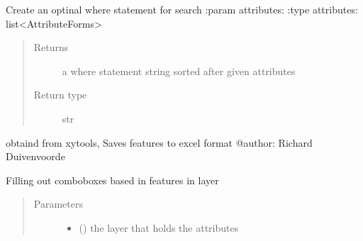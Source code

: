 \documentclass[letterpaper,10pt,english]{sphinxmanual}
\begin{document}
\begin{fulllineitems}
\begin{fulllineitems}
\end{fulllineitems}


\begin{fulllineitems}
\label{\detokenize{code:Tilgjengelighet.Tilgjengelighet.create_where_statement2}}
Create an optinal where statement for search
:param attributes:
:type attributes: list\textless{}AttributeForms\textgreater{}
\begin{quote}\begin{description}
\item[{Returns}] \leavevmode
a where statement string sorted after given attributes

\item[{Return type}] \leavevmode
str

\end{description}\end{quote}

\end{fulllineitems}


\begin{fulllineitems}
\label{\detokenize{code:Tilgjengelighet.Tilgjengelighet.excelSave}}
obtaind from xytools, Saves features to excel format
@author: Richard Duivenvoorde

\end{fulllineitems}


\begin{fulllineitems}
\label{\detokenize{code:Tilgjengelighet.Tilgjengelighet.fill_combobox}}
Filling out comboboxes based in features in layer
\begin{quote}\begin{description}
\item[{Parameters}] \leavevmode\begin{itemize}
\item {} 
 () \textendash{} the layer that holds the attributes


\end{itemize}
\end{description}
\end{quote}
\end{fulllineitems}
\end{fulllineitems}
\end{document}
